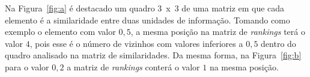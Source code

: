 Na Figura~\ref{fig:a} é destacado um quadro 3~x~3 de uma matriz em que cada elemento é a similaridade entre duas unidades de informação. 
%
Tomando como exemplo o elemento com valor $0,5$, a mesma posição na matriz de \textit{rankings} terá o valor $4$, pois esse é o número de vizinhos com valores inferiores a $0,5$ dentro do quadro analisado na matriz de similaridades. Da mesma forma, na Figura~\ref{fig:b} para o valor $0,2$ a matriz de \textit{rankings} conterá o valor $1$ na mesma posição.











%
%
%
%
%
%
%
% 
%


% 
% 







